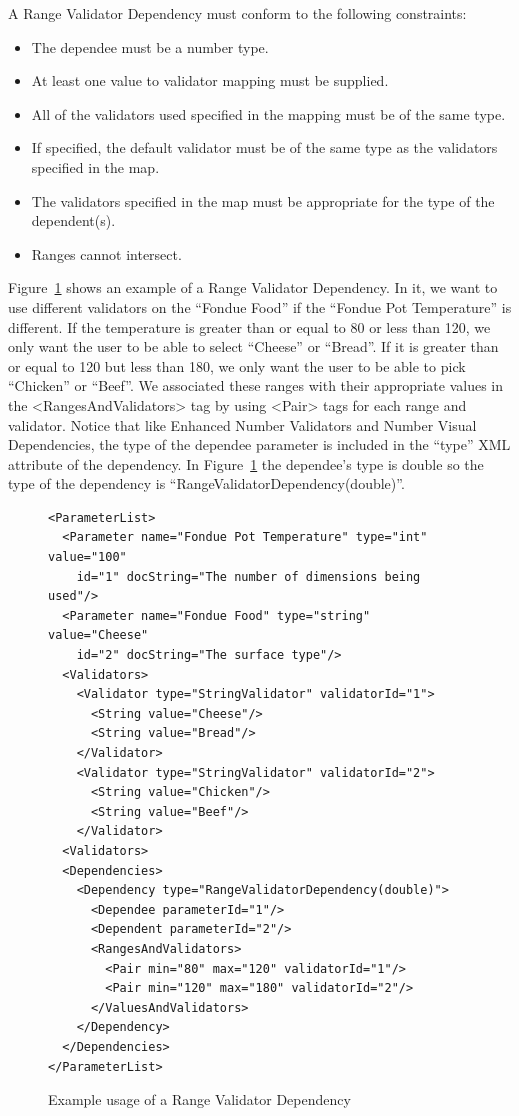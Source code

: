 A Range Validator Dependency must conform to the following constraints:
\begin{itemize}
\item The dependee must be a number type.
\item At least one value to validator mapping must be supplied.
\item All of the validators used specified in the mapping must be of the same type.
\item If specified, the default validator must be of the same type as the validators specified in the map.
\item The validators specified in the map must be appropriate for the type of the dependent(s).
\item Ranges cannot intersect.
\end{itemize}

Figure~\ref{RangeValiDepXML} shows an example of a Range Validator Dependency. In it, we want to use different validators
on the ``Fondue Food'' if the ``Fondue Pot Temperature'' is different. If the temperature is greater than or equal to 80 or less than 120,
we only want the user to be able to select ``Cheese'' or ``Bread''. If it is greater than or equal to 120 but less than 180, we only want the
user to be able to pick ``Chicken'' or ``Beef''. We associated these ranges with their appropriate values in the <RangesAndValidators> tag by
using <Pair> tags for each range and validator. Notice that like Enhanced Number Validators and Number Visual Dependencies, the type of the dependee parameter is 
included in the ``type'' XML attribute of the dependency. In Figure~\ref{RangeValiDepXML} the dependee's type is double so the type of the dependency is 
``RangeValidatorDependency(double)''.
\begin{figure}
\centering
{\footnotesize
\begin{Verbatim}
<ParameterList>
  <Parameter name="Fondue Pot Temperature" type="int" value="100"
    id="1" docString="The number of dimensions being used"/>
  <Parameter name="Fondue Food" type="string" value="Cheese"
    id="2" docString="The surface type"/>
  <Validators>
    <Validator type="StringValidator" validatorId="1">
      <String value="Cheese"/>
      <String value="Bread"/>
    </Validator>
    <Validator type="StringValidator" validatorId="2">
      <String value="Chicken"/>
      <String value="Beef"/>
    </Validator>
  <Validators>
  <Dependencies>
    <Dependency type="RangeValidatorDependency(double)">
      <Dependee parameterId="1"/>
      <Dependent parameterId="2"/>
      <RangesAndValidators>
        <Pair min="80" max="120" validatorId="1"/>
        <Pair min="120" max="180" validatorId="2"/>
      </ValuesAndValidators>
    </Dependency>
  </Dependencies>
</ParameterList>
\end{Verbatim}
}
\caption{Example usage of a Range Validator Dependency}
\label{RangeValiDepXML}
\end{figure}

